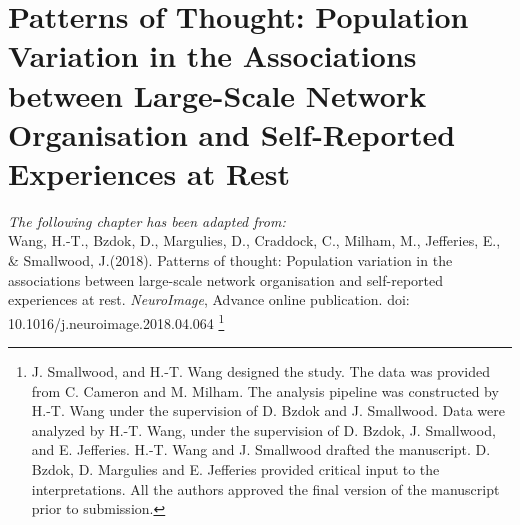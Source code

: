 \chapter{Patterns of Thought: Population Variation in the Associations between Large-Scale Network Organisation and Self-Reported Experiences at Rest}
\label{ch:study2}

\textit{The following chapter has been adapted from:\\}
Wang, H.-T., Bzdok, D., Margulies, D., Craddock, C., Milham, M., Jefferies, E., \& Smallwood, J.(2018). Patterns of thought: Population variation in the associations between large-scale network organisation and self-reported experiences at rest. \textit{NeuroImage}, Advance online publication. doi: 10.1016/j.neuroimage.2018.04.064
\footnote{
J. Smallwood, and H.-T. Wang designed the study. The data was provided from C. Cameron and M. Milham. The analysis pipeline was constructed by H.-T. Wang under the supervision of D. Bzdok and J. Smallwood. Data were analyzed by H.-T. Wang, under the supervision of D. Bzdok, J. Smallwood, and E. Jefferies. H.-T. Wang and J. Smallwood drafted the manuscript. D. Bzdok, D. Margulies and E. Jefferies provided critical input to the interpretations. All the authors approved the final version of the manuscript prior to submission.}
\\

